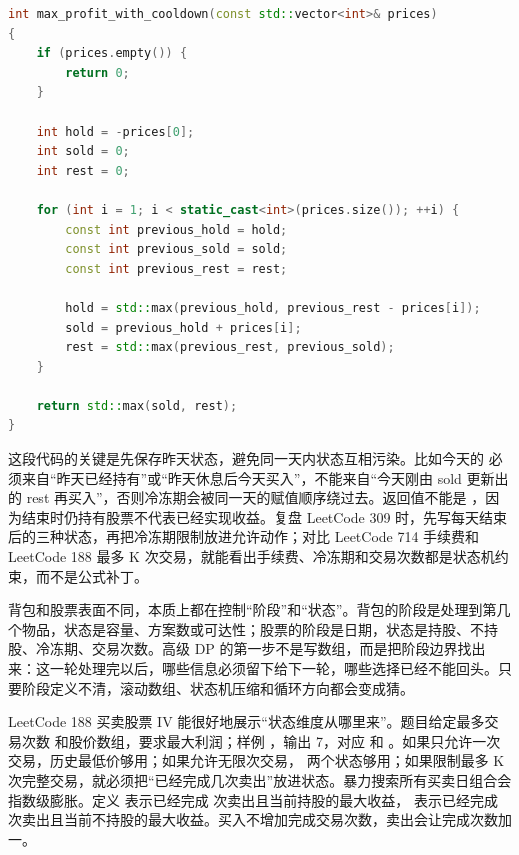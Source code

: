 \begin{lstlisting}[language=C++,caption={LeetCode 309 含冷冻期股票：三状态 DP}]
int max_profit_with_cooldown(const std::vector<int>& prices)
{
    if (prices.empty()) {
        return 0;
    }

    int hold = -prices[0];
    int sold = 0;
    int rest = 0;

    for (int i = 1; i < static_cast<int>(prices.size()); ++i) {
        const int previous_hold = hold;
        const int previous_sold = sold;
        const int previous_rest = rest;

        hold = std::max(previous_hold, previous_rest - prices[i]);
        sold = previous_hold + prices[i];
        rest = std::max(previous_rest, previous_sold);
    }

    return std::max(sold, rest);
}
\end{lstlisting}

这段代码的关键是先保存昨天状态，避免同一天内状态互相污染。比如今天的  必须来自“昨天已经持有”或“昨天休息后今天买入”，不能来自“今天刚由 sold 更新出的 rest 再买入”，否则冷冻期会被同一天的赋值顺序绕过去。返回值不能是 ，因为结束时仍持有股票不代表已经实现收益。复盘 LeetCode 309 时，先写每天结束后的三种状态，再把冷冻期限制放进允许动作；对比 LeetCode 714 手续费和 LeetCode 188 最多 K 次交易，就能看出手续费、冷冻期和交易次数都是状态机约束，而不是公式补丁。

背包和股票表面不同，本质上都在控制“阶段”和“状态”。背包的阶段是处理到第几个物品，状态是容量、方案数或可达性；股票的阶段是日期，状态是持股、不持股、冷冻期、交易次数。高级 DP 的第一步不是写数组，而是把阶段边界找出来：这一轮处理完以后，哪些信息必须留下给下一轮，哪些选择已经不能回头。只要阶段定义不清，滚动数组、状态机压缩和循环方向都会变成猜。

LeetCode 188 买卖股票 IV 能很好地展示“状态维度从哪里来”。题目给定最多交易次数  和股价数组，要求最大利润；样例 ，输出 7，对应  和 。如果只允许一次交易，历史最低价够用；如果允许无限次交易， 两个状态够用；如果限制最多 K 次完整交易，就必须把“已经完成几次卖出”放进状态。暴力搜索所有买卖日组合会指数级膨胀。定义  表示已经完成  次卖出且当前持股的最大收益， 表示已经完成  次卖出且当前不持股的最大收益。买入不增加完成交易次数，卖出会让完成次数加一。

